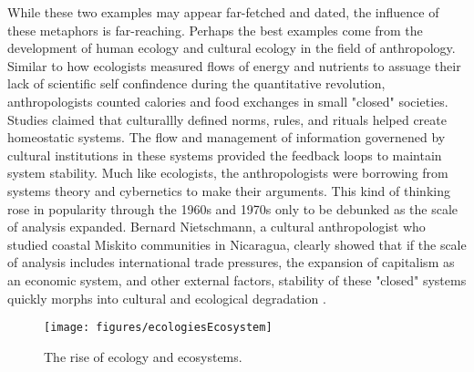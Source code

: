 While these two examples may appear far-fetched and dated, the influence of these metaphors is far-reaching. Perhaps the best examples come from the development of human ecology and cultural ecology in the field of anthropology. Similar to how ecologists measured flows of energy and nutrients to assuage their lack of scientific self confindence during the quantitative revolution, anthropologists counted calories and food exchanges in small "closed" societies. Studies claimed that culturallly defined norms, rules, and rituals helped create homeostatic systems. The flow and management of information governened by cultural institutions in these systems provided the feedback loops to maintain system stability. Much like ecologists, the anthropologists were borrowing from systems theory and cybernetics to make their arguments. This kind of thinking rose in popularity through the 1960s and 1970s only to be debunked as the scale of analysis expanded. Bernard Nietschmann, a cultural anthropologist who studied coastal Miskito communities in Nicaragua, clearly showed that if the scale of analysis includes international trade pressures, the expansion of capitalism as an economic system, and other external factors, stability of these "closed" systems quickly morphs into cultural and ecological degradation \citep{nietschmannn_1973}.

\begin{figure}[!ht]
  \centering
    \texttt{[image: figures/ecologiesEcosystem]}
  \caption{The rise of ecology and ecosystems.}
\end{figure} 

